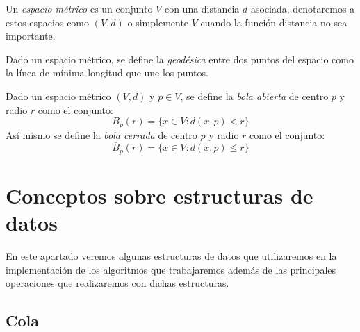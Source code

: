 \begin{definicion}
	Un \textit{espacio métrico} es un conjunto $V$ con una distancia $d$ asociada, denotaremos a estos espacios como $(V,d)$ o simplemente $V$ cuando la función distancia no sea importante.
\end{definicion}

\begin{definicion}
	Dado un espacio métrico, se define la \textit{geodésica} entre dos puntos del espacio como la línea de mínima longitud que une los puntos.
\end{definicion}

\begin{definicion}
	Dado un espacio métrico $(V,d)$ y $p \in V$, se define la \textit{bola abierta} de centro $p$ y radio $r$ como el conjunto:
	$$B_p(r) = \{x \in V : d(x,p) < r\}$$
	Así mismo se define la \textit{bola cerrada} de centro $p$ y radio $r$ como el conjunto:
	$$\overline B_p(r) = \{x \in V : d(x,p) \leq r\}$$
\end{definicion}




\section{Conceptos sobre estructuras de datos}

En este apartado veremos algunas estructuras de datos que utilizaremos en la implementación de los algoritmos que trabajaremos además de las principales operaciones que realizaremos con dichas estructuras.

\subsection{Cola}

